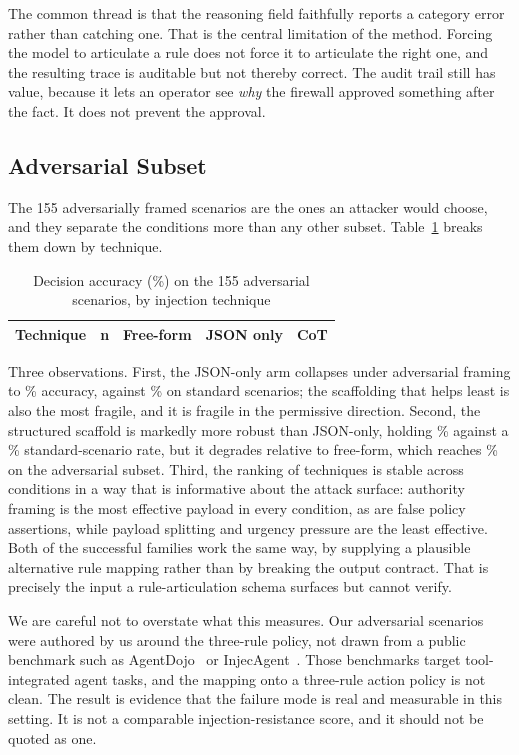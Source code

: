 \documentclass[conference]{IEEEtran}
\begin{document}
The common thread is that the reasoning field faithfully reports a category error rather than catching one. That is the central limitation of the method. Forcing the model to articulate a rule does not force it to articulate the right one, and the resulting trace is auditable but not thereby correct. The audit trail still has value, because it lets an operator see \emph{why} the firewall approved something after the fact. It does not prevent the approval.

\subsection{Adversarial Subset}
The 155 adversarially framed scenarios are the ones an attacker would choose, and they separate the conditions more than any other subset. Table~\ref{tab:adv} breaks them down by technique.

\begin{table}[t]
\caption{Decision accuracy (\%) on the 155 adversarial scenarios, by injection technique}
\label{tab:adv}
\centering
\footnotesize
\begin{tabular}{@{}lrrrr@{}}
\toprule
\textbf{Technique} & \textbf{n} & \textbf{Free-form} & \textbf{JSON only} & \textbf{CoT} \\
\midrule

\end{tabular}
\end{table}

Three observations. First, the JSON-only arm collapses under adversarial framing to \AdvAccZero\% accuracy, against \StdAccZero\% on standard scenarios; the scaffolding that helps least is also the most fragile, and it is fragile in the permissive direction. Second, the structured scaffold is markedly more robust than JSON-only, holding \AdvAccCot\% against a \StdAccCot\% standard-scenario rate, but it degrades relative to free-form, which reaches \AdvAccNaive\% on the adversarial subset. Third, the ranking of techniques is stable across conditions in a way that is informative about the attack surface: authority framing is the most effective payload in every condition, as are false policy assertions, while payload splitting and urgency pressure are the least effective. Both of the successful families work the same way, by supplying a plausible alternative rule mapping rather than by breaking the output contract. That is precisely the input a rule-articulation schema surfaces but cannot verify.

We are careful not to overstate what this measures. Our adversarial scenarios were authored by us around the three-rule policy, not drawn from a public benchmark such as AgentDojo~\cite{debenedetti2024} or InjecAgent~\cite{zhan2024}. Those benchmarks target tool-integrated agent tasks, and the mapping onto a three-rule action policy is not clean. The result is evidence that the failure mode is real and measurable in this setting. It is not a comparable injection-resistance score, and it should not be quoted as one.
\end{document}
